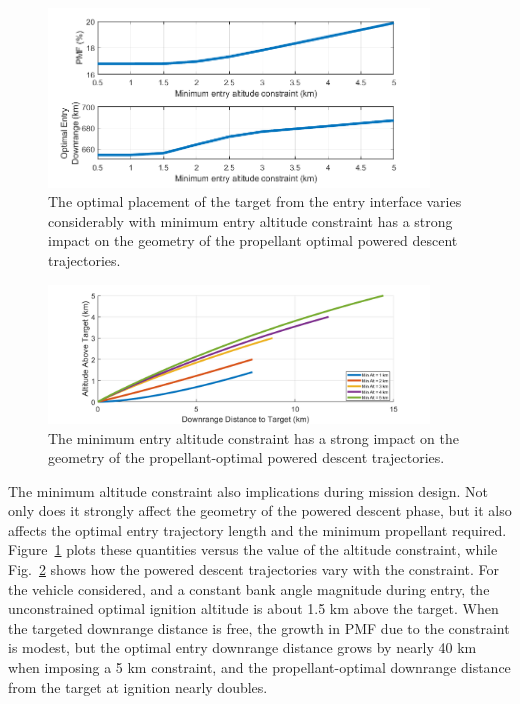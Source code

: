 \begin{figure}[h!]
	\centering
	\includegraphics[width=0.9\textwidth]{../AAS20/min_alt_constraint} 
	\caption{The optimal placement of the target from the entry interface varies considerably with minimum entry altitude constraint has a strong impact on the geometry of the propellant optimal powered descent trajectories.}
	\label{fig_min_alt_constraint}
\end{figure} 
\begin{figure}[h!]
	\centering
	\includegraphics[width=0.9\textwidth]{../AAS20/SRP_vs_min_alt} 
	\caption{The minimum entry altitude constraint has a strong impact on the geometry of the propellant-optimal powered descent trajectories.}
	\label{fig_srp_traj}
\end{figure} 
 
The minimum altitude constraint also implications during mission design. Not only does it strongly affect the geometry of the powered descent phase, but it also affects the optimal entry trajectory length and the minimum propellant required.
 Figure~\ref{fig_min_alt_constraint} plots these quantities versus the value of the altitude constraint, while Fig.~\ref{fig_srp_traj} shows how the powered descent trajectories vary with the constraint. 
For the vehicle considered, and a constant bank angle magnitude during entry, the unconstrained optimal ignition altitude is about 1.5 km above the target. When the targeted downrange distance is free, the growth in PMF due to the constraint is modest, but the optimal entry downrange distance grows by nearly 40 km when imposing a 5 km constraint, and the propellant-optimal downrange distance from the target at ignition nearly doubles. 
 
